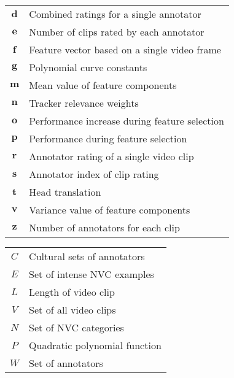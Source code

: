 \documentclass[11pt]{book}  %
\def\crossCategoryRatings{\textbf{d}}
\def\numRatingsForAnnotator{\textbf{e}}
\def\frameFeature{\textbf{f}} %
\def\polyConsts{\textbf{g}} %
\def\componentMean{\textbf{m}} %
\def\trackerWeightNorm{\textbf{n}}
\def\weightSingleFeature{\textbf{o}}
\def\systemPerformance{\textbf{p}}
\def\ratingOfClip{\textbf{r}} %
\def\annotatorOfRating{\textbf{s}} %
\def\headTranslation{\textbf{t}} %
\def\componentVariance{\textbf{v}} %
\def\numAnnotatorsOnClip{\textbf{z}} %
\def\cultureList{C}
\def\clearClipSet{E}
\def\lengthofclip{L} %
\def\setCategories{N}
\def\allClipSet{V}
\def\polyFunc{P}
\def\workerSet{W}
\begin{document}
\begin{center}
\begin{tabular*}{0.75\textwidth}{  c | l  }
$\crossCategoryRatings$	& Combined ratings for a single annotator \\
$\numRatingsForAnnotator$	& Number of clips rated by each annotator \\
$\frameFeature$		& Feature vector based on a single video frame \\
$\polyConsts$		& Polynomial curve constants \\
$\componentMean$	& Mean value of feature components \\
$\trackerWeightNorm$	& Tracker relevance weights \\
$\weightSingleFeature$	& Performance increase during feature selection \\
$\systemPerformance$	& Performance during feature selection\\
$\ratingOfClip$		& Annotator rating of a single video clip \\
$\annotatorOfRating$	& Annotator index of clip rating \\
$\headTranslation$	& Head translation\\
$\componentVariance$	& Variance value of feature components\\
$\numAnnotatorsOnClip$	& Number of annotators for each clip\\
\end{tabular*}

\begin{tabular*}{0.75\textwidth}{  c | l  }
$\cultureList$		& Cultural sets of annotators \\
$\clearClipSet$		& Set of intense \ac{NVC} examples \\
$\lengthofclip$		& Length of video clip\\
$\allClipSet$		& Set of all video clips\\
$\setCategories$	& Set of \ac{NVC} categories \\
$\polyFunc$		& Quadratic polynomial function \\
$\workerSet$		& Set of annotators \\

\end{tabular*}


\end{center}
\end{document}
